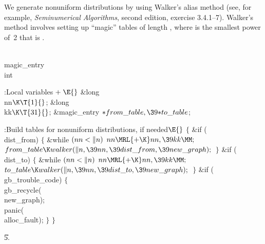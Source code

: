 We generate nonuniform distributions by using Walker's alias
method (see, for example, {\sl Seminumerical Algorithms}, second edition,
exercise 3.4.1--7). Walker's method involves setting up ``magic'' tables
of length , where  is the smallest power of~2 that is %
.

\Y\B\F\\{magic\_entry}\5
\\{int}\par
\Y\B\4:Local variables\X${}\mathrel+\E{}$\6
\&{long} \\{nn}${}\K\T{1}{}$;\6
\&{long} \\{kk}${}\K\T{31}{}$;\6
\&{magic\_entry} ${}{*}\\{from\_table},\39{*}\\{to\_table}{}$;\par
\fi

\B{}:Build tables for nonuniform distributions, if needed\X${}\E{}$\6
${}\{{}$\1\6
\&{if} (\\{dist\_from})\5
${}\{{}$\1\6
\&{while} ${}(\\{nn}<\|n){}$\1\5
${}\\{nn}\MRL{+{\K}}\\{nn},\39\\{kk}\MM;{}$\2\6
${}\\{from\_table}\K\\{walker}(\|n,\39\\{nn},\39\\{dist\_from},\39\\{new%
\_graph});{}$\6
\4${}\}{}$\2\6
\&{if} (\\{dist\_to})\5
${}\{{}$\1\6
\&{while} ${}(\\{nn}<\|n){}$\1\5
${}\\{nn}\MRL{+{\K}}\\{nn},\39\\{kk}\MM;{}$\2\6
${}\\{to\_table}\K\\{walker}(\|n,\39\\{nn},\39\\{dist\_to},\39\\{new%
\_graph});{}$\6
\4${}\}{}$\2\6
\&{if} (\\{gb\_trouble\_code})\5
${}\{{}$\1\6
\\{gb\_recycle}(\\{new\_graph});\6
\\{panic}(\\{alloc\_fault});\6
\4${}\}{}$\2\6
\4${}\}{}$\2\par
\U5.\fi

